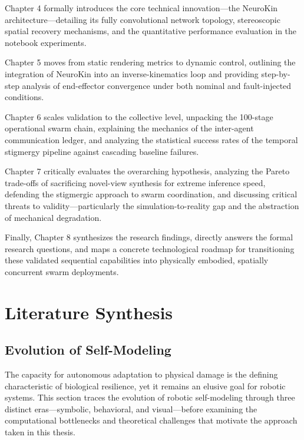 \documentclass[12pt,a4paper,oneside]{report}
\begin{document}
Chapter 4 formally introduces the core technical innovation—the NeuroKin architecture—detailing its fully convolutional network topology, stereoscopic spatial recovery mechanisms, and the quantitative performance evaluation in the notebook experiments.

Chapter 5 moves from static rendering metrics to dynamic control, outlining the integration of NeuroKin into an inverse-kinematics loop and providing step-by-step analysis of end-effector convergence under both nominal and fault-injected conditions.

Chapter 6 scales validation to the collective level, unpacking the 100-stage operational swarm chain, explaining the mechanics of the inter-agent communication ledger, and analyzing the statistical success rates of the temporal stigmergy pipeline against cascading baseline failures.

Chapter 7 critically evaluates the overarching hypothesis, analyzing the Pareto trade-offs of sacrificing novel-view synthesis for extreme inference speed, defending the stigmergic approach to swarm coordination, and discussing critical threats to validity—particularly the simulation-to-reality gap and the abstraction of mechanical degradation.

Finally, Chapter 8 synthesizes the research findings, directly answers the formal research questions, and maps a concrete technological roadmap for transitioning these validated sequential capabilities into physically embodied, spatially concurrent swarm deployments.












\chapter{Literature Synthesis}

\section{Evolution of Self-Modeling}

The capacity for autonomous adaptation to physical damage is the defining characteristic of biological resilience, yet it remains an elusive goal for robotic systems. This section traces the evolution of robotic self-modeling through three distinct eras—symbolic, behavioral, and visual—before examining the computational bottlenecks and theoretical challenges that motivate the approach taken in this thesis.
\end{document}
